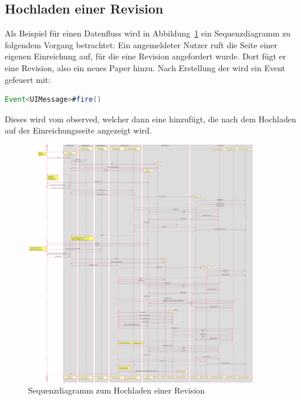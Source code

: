 
\subsection{Hochladen einer Revision}\label{subsec:sequenz-revision-hochladen}

Als Beispiel für einen Datenfluss wird in Abbildung~\ref{fig:upload-revision-sequence} ein Sequenzdiagramm zu folgendem Vorgang betrachtet:
Ein angemeldeter Nutzer ruft die Seite einer eigenen Einreichung auf, für die eine Revision angefordert wurde.
Dort fügt er eine Revision, also ein neues Paper hinzu.
Nach Erstellung der  wird ein Event gefeuert mit:
{\small
\begin{lstlisting}[language=Java]
    Event<UIMessage>#fire()
\end{lstlisting}
}
Dieses wird vom  observed, welcher dann eine \footnotemark hinzufügt,
die nach dem Hochladen auf der Einreichungsseite angezeigt wird.


\begin{figure}[H]
    \centering
    \includegraphics[width=0.9\textwidth]{graphics/upload_revision}
    \caption{Sequenzdiagramm zum Hochladen einer Revision}
    \label{fig:upload-revision-sequence}
\end{figure}

